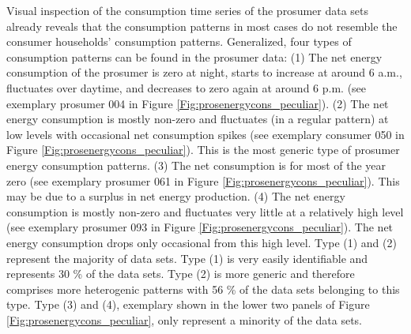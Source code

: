 Visual inspection of the consumption time series of the prosumer data sets already reveals that the consumption patterns in most cases do not resemble the consumer households' consumption patterns. Generalized, four types of consumption patterns can be found in the prosumer data: (1) The net energy consumption of the prosumer is zero at night, starts to increase at around 6 a.m., fluctuates over daytime, and decreases to zero again at around 6 p.m. (see exemplary prosumer 004 in Figure \ref{Fig:prosenergycons_peculiar}). (2) The net energy consumption is mostly non-zero and fluctuates (in a regular pattern) at low levels with occasional net consumption spikes (see exemplary consumer 050 in Figure \ref{Fig:prosenergycons_peculiar}). This is the most generic type of prosumer energy consumption patterns. (3) The net consumption is for most of the year zero (see exemplary prosumer 061 in Figure \ref{Fig:prosenergycons_peculiar}). This may be due to a surplus in net energy production. (4) The net energy consumption is mostly non-zero and fluctuates very little at a relatively high level (see exemplary prosumer 093 in Figure \ref{Fig:prosenergycons_peculiar}). The net energy consumption drops only occasional from this high level. Type (1) and (2) represent the majority of data sets. Type (1) is very easily identifiable and represents 30 \% of the data sets. Type (2) is more generic and therefore comprises more heterogenic patterns with 56 \% of the data sets belonging to this type. Type (3) and (4), exemplary shown in the lower two panels of Figure \ref{Fig:prosenergycons_peculiar}, only represent a minority of the data sets.

